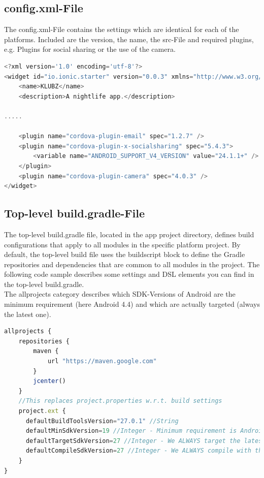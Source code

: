 \documentclass[12pt]{article}
\begin{document}
\subsection{config.xml-File}

The config.xml-File contains the settings which are identical for each of the platforms.
Included are the version, the name, the src-File and required plugins, e.g. Plugins for social sharing or the use of the camera.

\begin{lstlisting}[language=javascript]
<?xml version='1.0' encoding='utf-8'?>
<widget id="io.ionic.starter" version="0.0.3" xmlns="http://www.w3.org/ns/widgets" xmlns:cdv="http://cordova.apache.org/ns/1.0">
    <name>KLUBZ</name>
    <description>A nightlife app.</description>
    
.....

	<plugin name="cordova-plugin-email" spec="1.2.7" />
    <plugin name="cordova-plugin-x-socialsharing" spec="5.4.3">
        <variable name="ANDROID_SUPPORT_V4_VERSION" value="24.1.1+" />
    </plugin>
    <plugin name="cordova-plugin-camera" spec="4.0.3" />
</widget>
\end{lstlisting}


\subsection{Top-level build.gradle-File}

The top-level build.gradle file, located in the app project directory, defines build configurations that apply to all modules in the specific platform project. By default, the top-level build file uses the buildscript block to define the Gradle repositories and dependencies that are common to all modules in the project. The following code sample describes some settings and DSL elements you can find in the top-level build.gradle.\\
The allprojects category describes which SDK-Versions of Android are the minimum requirement (here Android 4.4) and which are actually targeted (always the latest one).

\begin{lstlisting}[language=javascript]
allprojects {
    repositories {
        maven {
            url "https://maven.google.com"
        }
        jcenter()
    }
    //This replaces project.properties w.r.t. build settings
    project.ext {
      defaultBuildToolsVersion="27.0.1" //String
      defaultMinSdkVersion=19 //Integer - Minimum requirement is Android 4.4
      defaultTargetSdkVersion=27 //Integer - We ALWAYS target the latest by default
      defaultCompileSdkVersion=27 //Integer - We ALWAYS compile with the latest by default
    }
}
\end{lstlisting}
\end{document}
